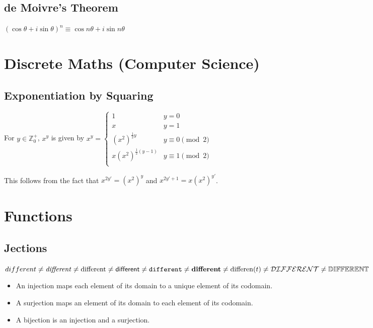 \documentclass[a4paper,11pt]{article}
\begin{document}
    \subsection{de Moivre's Theorem}

    $(\cos \theta + i \sin \theta)^n \equiv \cos n\theta + i \sin n\theta$

    \section{Discrete Maths (Computer Science)}

    \subsection{Exponentiation by Squaring} \label{sec:exp_by_squaring}

    For $y \in \mathbb{Z}_0^+$, $x^y$ is given by
    $x^y =
        \begin{cases}
        1 & y = 0 \\
        x & y = 1 \\
        (x ^ 2)^{\frac 12 y} & y \equiv 0 \pmod 2\\
        x(x ^ 2)^{\frac 12 (y-1)} & y \equiv 1 \pmod 2\\
        \end{cases}$

    This follows from the fact that
    $x^{2y'} = (x^2)^{y}$ and $x^{2y' + 1} = x(x^2)^{y'}$.

    \section{Functions}

    \subsection{Jections}


    $different \ne          %
     \mathit{different} \ne %
     \mathrm{different} \ne %
     \mathsf{different} \ne %
     \mathtt{different} \ne %
     \mathbf{different} \ne %
     \operatorname{differen}(t) \ne %
  \\ \mathcal{DIFFERENT} \ne %
     \mathbb{DIFFERENT} $    %

    \begin{itemize}
    \item An injection maps each element of its domain to a unique element of
          its codomain.
    \item A surjection maps an element of its domain to each element of its
          codomain.
    \item A bijection is an injection and a surjection.
    \end{itemize}
\end{document}
